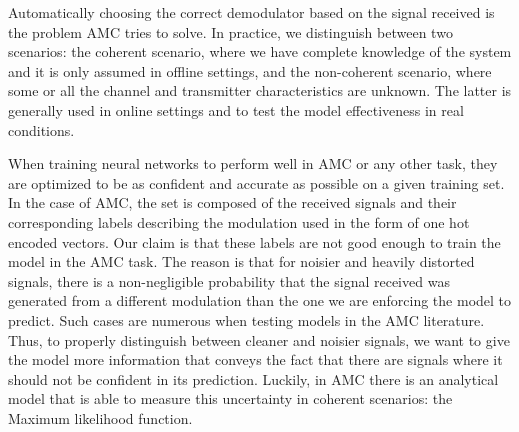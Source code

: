 \documentclass[conference]{IEEEtran}
\begin{document}
Automatically choosing the correct demodulator based on the signal received is the problem AMC tries to solve. 
In practice, we distinguish between two scenarios: the coherent scenario, where we have complete knowledge of the system and it is only assumed in offline settings, and the non-coherent scenario, where some or all the channel and transmitter characteristics are unknown. The latter is generally used in online settings and to test the model effectiveness in real conditions.

When training neural networks to perform well in AMC or any other task, they are optimized to be as confident and accurate as possible on a given training set. In the case of AMC, the set is composed of the received signals and their corresponding labels describing the modulation used in the form of one hot encoded vectors. Our claim is that these labels are not good enough to train the model in the AMC task. The reason is that for noisier and heavily distorted signals, there is a non-negligible probability that the signal received was generated from a different modulation than the one we are enforcing the model to predict. Such cases are numerous when testing models in the AMC literature. Thus, to properly distinguish between cleaner and noisier signals, we want to give the model more information that conveys the fact that there are signals where it should not be confident in its prediction. Luckily, in AMC there is an analytical model that is able to measure this uncertainty in coherent scenarios: the Maximum likelihood function. 
\end{document}
